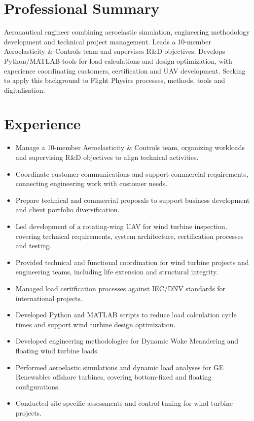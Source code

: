 

\small
\section{Professional Summary}
Aeronautical engineer combining aeroelastic simulation, engineering methodology development and technical project management. Leads a 10-member Aeroelasticity \& Controls team and supervises R\&D objectives. Develops Python/MATLAB tools for load calculations and design optimization, with experience coordinating customers, certification and UAV development. Seeking to apply this background to Flight Physics processes, methods, tools and digitalisation.
\section{Experience}
\begin{itemize}
\item Manage a 10-member Aeroelasticity \& Controls team, organizing workloads and supervising R\&D objectives to align technical activities.
\item Coordinate customer communications and support commercial requirements, connecting engineering work with customer needs.
\item Prepare technical and commercial proposals to support business development and client portfolio diversification.
\end{itemize}
\begin{itemize}
\item Led development of a rotating-wing UAV for wind turbine inspection, covering technical requirements, system architecture, certification processes and testing.
\item Provided technical and functional coordination for wind turbine projects and engineering teams, including life extension and structural integrity.
\item Managed load certification processes against IEC/DNV standards for international projects.
\end{itemize}
\begin{itemize}
\item Developed Python and MATLAB scripts to reduce load calculation cycle times and support wind turbine design optimization.
\item Developed engineering methodologies for Dynamic Wake Meandering and floating wind turbine loads.
\item Performed aeroelastic simulations and dynamic load analyses for GE Renewables offshore turbines, covering bottom-fixed and floating configurations.
\item Conducted site-specific assessments and control tuning for wind turbine projects.
\end{itemize}

